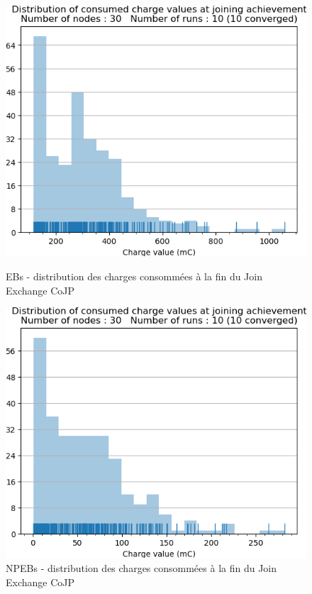 \documentclass[]{report}
\begin{document}
\begin{figure}[!ht]
	\begin{minipage}{0.49\textwidth}
		\centering
		\includegraphics[width=\textwidth]{results/EB/chargejoined.hist}
		\caption{EBs - distribution des charges consommées à la fin du Join Exchange CoJP}
		\label{fig:EBchargesjoined}
	\end{minipage}\hfill
	\begin{minipage}{0.5\textwidth}
		\centering
		\includegraphics[width=\textwidth]{results/NPEB/chargejoined.hist}
		\caption{NPEBs - distribution des charges consommées à la fin du Join Exchange CoJP}
		\label{fig:NPEBchargesjoined}
	\end{minipage}	
\end{figure}
\end{document}
